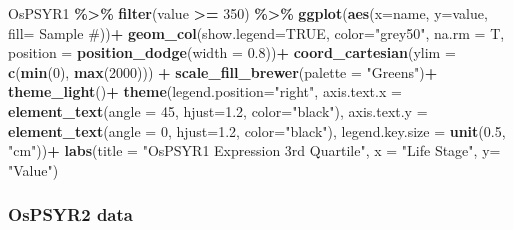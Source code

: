 \documentclass[
]{article}
\newenvironment{Shaded}{\begin{snugshade}}{\end{snugshade}}
\newcommand{\AttributeTok}[1]{\textcolor[rgb]{0.13,0.29,0.53}{#1}}
\newcommand{\ConstantTok}[1]{\textcolor[rgb]{0.56,0.35,0.01}{#1}}
\newcommand{\DecValTok}[1]{\textcolor[rgb]{0.00,0.00,0.81}{#1}}
\newcommand{\FloatTok}[1]{\textcolor[rgb]{0.00,0.00,0.81}{#1}}
\newcommand{\FunctionTok}[1]{\textcolor[rgb]{0.13,0.29,0.53}{\textbf{#1}}}
\newcommand{\NormalTok}[1]{#1}
\newcommand{\SpecialCharTok}[1]{\textcolor[rgb]{0.81,0.36,0.00}{\textbf{#1}}}
\newcommand{\StringTok}[1]{\textcolor[rgb]{0.31,0.60,0.02}{#1}}
\begin{document}
\begin{Shaded}
\begin{Highlighting}[]
\NormalTok{OsPSYR1 }\SpecialCharTok{\%\textgreater{}\%} 
  \FunctionTok{filter}\NormalTok{(value }\SpecialCharTok{\textgreater{}=} \DecValTok{350}\NormalTok{) }\SpecialCharTok{\%\textgreater{}\%} 
  \FunctionTok{ggplot}\NormalTok{(}\FunctionTok{aes}\NormalTok{(}\AttributeTok{x=}\NormalTok{name, }\AttributeTok{y=}\NormalTok{value, }\AttributeTok{fill=} \StringTok{\textasciigrave{}}\AttributeTok{Sample \#}\StringTok{\textasciigrave{}}\NormalTok{))}\SpecialCharTok{+}
  \FunctionTok{geom\_col}\NormalTok{(}\AttributeTok{show.legend=}\ConstantTok{TRUE}\NormalTok{, }\AttributeTok{color=}\StringTok{"grey50"}\NormalTok{, }\AttributeTok{na.rm =}\NormalTok{ T, }\AttributeTok{position =} \FunctionTok{position\_dodge}\NormalTok{(}\AttributeTok{width =} \FloatTok{0.8}\NormalTok{))}\SpecialCharTok{+}
  \FunctionTok{coord\_cartesian}\NormalTok{(}\AttributeTok{ylim =} \FunctionTok{c}\NormalTok{(}\FunctionTok{min}\NormalTok{(}\DecValTok{0}\NormalTok{), }\FunctionTok{max}\NormalTok{(}\DecValTok{2000}\NormalTok{))) }\SpecialCharTok{+}
  \FunctionTok{scale\_fill\_brewer}\NormalTok{(}\AttributeTok{palette =} \StringTok{"Greens"}\NormalTok{)}\SpecialCharTok{+}
  \FunctionTok{theme\_light}\NormalTok{()}\SpecialCharTok{+}
  \FunctionTok{theme}\NormalTok{(}\AttributeTok{legend.position=}\StringTok{"right"}\NormalTok{, }
        \AttributeTok{axis.text.x =} \FunctionTok{element\_text}\NormalTok{(}\AttributeTok{angle =} \DecValTok{45}\NormalTok{, }\AttributeTok{hjust=}\FloatTok{1.2}\NormalTok{, }\AttributeTok{color=}\StringTok{"black"}\NormalTok{), }
        \AttributeTok{axis.text.y =} \FunctionTok{element\_text}\NormalTok{(}\AttributeTok{angle =} \DecValTok{0}\NormalTok{, }\AttributeTok{hjust=}\FloatTok{1.2}\NormalTok{, }\AttributeTok{color=}\StringTok{"black"}\NormalTok{), }
        \AttributeTok{legend.key.size =} \FunctionTok{unit}\NormalTok{(}\FloatTok{0.5}\NormalTok{, }\StringTok{"cm"}\NormalTok{))}\SpecialCharTok{+}
  \FunctionTok{labs}\NormalTok{(}\AttributeTok{title =} \StringTok{"OsPSYR1 Expression 3rd Quartile"}\NormalTok{,}
       \AttributeTok{x =} \StringTok{"Life Stage"}\NormalTok{,}
       \AttributeTok{y=} \StringTok{"Value"}\NormalTok{)}
\end{Highlighting}
\end{Shaded}

\subsubsection{OsPSYR2 data}\label{ospsyr2-data}
\end{document}

